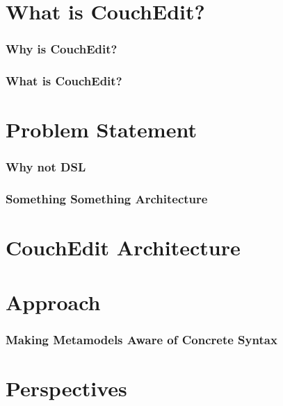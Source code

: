 \section{What is CouchEdit?}
\begin{frame}
  \frametitle{Why is CouchEdit?}
\end{frame}
\begin{frame}
  \frametitle{What is CouchEdit?}
\end{frame}



\section{Problem Statement}
\begin{frame}
  \frametitle{Why not DSL}
\end{frame}
\begin{frame}
  \frametitle{Something Something Architecture}
\end{frame}


\section{CouchEdit Architecture}


\section{Approach}
\begin{frame}
  \frametitle{Making Metamodels Aware of Concrete Syntax}
\end{frame}


\section{Perspectives}

